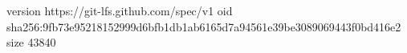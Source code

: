 version https://git-lfs.github.com/spec/v1
oid sha256:9fb73e95218152999d6bfb1db1ab6165d7a94561e39be3089069443f0bd416e2
size 43840
